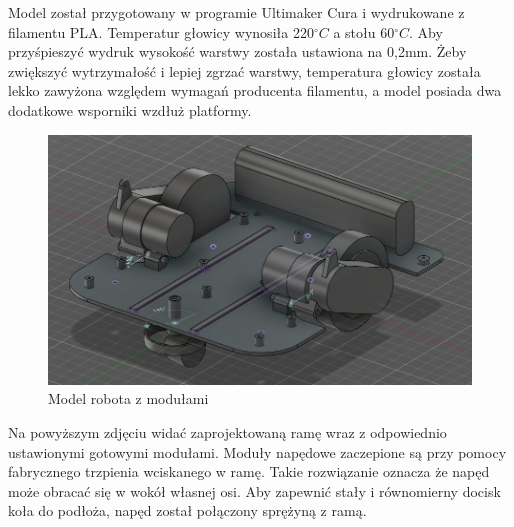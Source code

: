 Model został przygotowany w programie Ultimaker Cura i wydrukowane z filamentu PLA.
Temperatur głowicy wynosiła 220$ ^\circ C$ a stołu 60$ ^\circ C$. Aby przyśpieszyć wydruk wysokość warstwy została ustawiona na 0,2mm. 
Żeby zwiększyć wytrzymałość i lepiej zgrzać warstwy, temperatura głowicy została lekko zawyżona względem wymagań producenta filamentu,
a model posiada dwa dodatkowe wsporniki wzdłuż platformy.

\begin{figure}[H]
	\centering
	\includegraphics[width=14cm]{pages/robot/zdjecia/robotModelCaly.png}
	\caption{Model robota z modułami}
	\label{fig:robotModelCaly}
\end{figure}

Na powyższym zdjęciu widać zaprojektowaną ramę wraz z odpowiednio ustawionymi gotowymi modułami. 
Moduły napędowe zaczepione są przy pomocy fabrycznego trzpienia wciskanego w ramę. 
Takie rozwiązanie oznacza że napęd może obracać się w wokół własnej osi. Aby zapewnić stały i równomierny docisk koła do podłoża,
napęd został połączony sprężyną z ramą. 

